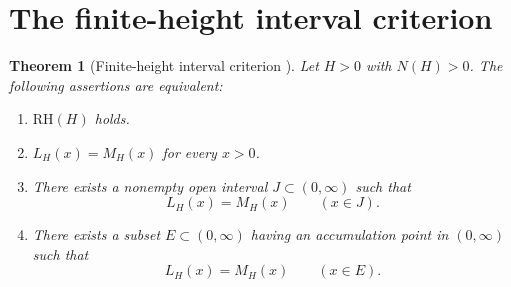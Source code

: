 \documentclass[11pt]{amsart}
\numberwithin{equation}{section}
\theoremstyle{plain}
\newtheorem{theorem}{Theorem}[section]
\theoremstyle{definition}
\theoremstyle{remark}
\newcommand{\RH}{\mathrm{RH}}
\begin{document}
\section{The finite-height interval criterion}
\label{sec:interval_criterion}

\begin{theorem}[Finite-height interval criterion {}]
\label{thm:finite_height_interval}
Let $H>0$ with $N(H)>0$.  The following assertions are equivalent:
\begin{enumerate}[label=\textup{(\roman*)}]
\item $\RH(H)$ holds.
\item $L_H(x)=M_H(x)$ for every $x>0$.
\item There exists a nonempty open interval $J\subset(0,\infty)$ such that
\begin{equation}
L_H(x)=M_H(x)
\qquad(x\in J).
\label{eq:interval_equality}
\end{equation}
\item There exists a subset $E\subset(0,\infty)$ having an accumulation point in $(0,\infty)$ such that
\begin{equation}
L_H(x)=M_H(x)
\qquad(x\in E).
\label{eq:accumulation_equality}
\end{equation}
\end{enumerate}
\end{theorem}
\end{document}
